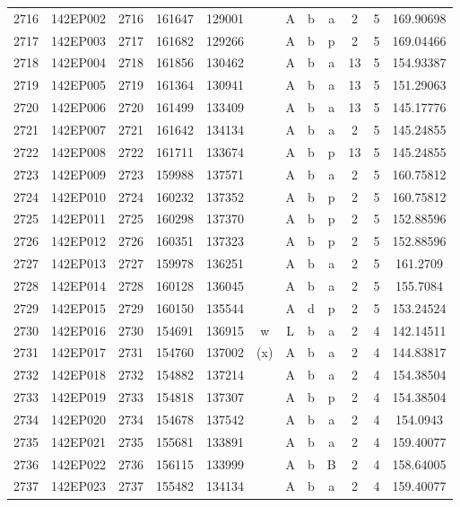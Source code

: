 \begin{tabular}{|*{12}{c|}}
2716 & 142EP002 & 2716 & 161647 & 129001 &  & A & b & a & 2 & 5 & 169.90698 \\ 
2717 & 142EP003 & 2717 & 161682 & 129266 &  & A & b & p & 2 & 5 & 169.04466 \\ 
2718 & 142EP004 & 2718 & 161856 & 130462 &  & A & b & a & 13 & 5 & 154.93387 \\ 
2719 & 142EP005 & 2719 & 161364 & 130941 &  & A & b & a & 13 & 5 & 151.29063 \\ 
2720 & 142EP006 & 2720 & 161499 & 133409 &  & A & b & a & 13 & 5 & 145.17776 \\ 
2721 & 142EP007 & 2721 & 161642 & 134134 &  & A & b & a & 2 & 5 & 145.24855 \\ 
2722 & 142EP008 & 2722 & 161711 & 133674 &  & A & b & p & 13 & 5 & 145.24855 \\ 
2723 & 142EP009 & 2723 & 159988 & 137571 &  & A & b & a & 2 & 5 & 160.75812 \\ 
2724 & 142EP010 & 2724 & 160232 & 137352 &  & A & b & p & 2 & 5 & 160.75812 \\ 
2725 & 142EP011 & 2725 & 160298 & 137370 &  & A & b & p & 2 & 5 & 152.88596 \\ 
2726 & 142EP012 & 2726 & 160351 & 137323 &  & A & b & p & 2 & 5 & 152.88596 \\ 
2727 & 142EP013 & 2727 & 159978 & 136251 &  & A & b & a & 2 & 5 & 161.2709 \\ 
2728 & 142EP014 & 2728 & 160128 & 136045 &  & A & b & a & 2 & 5 & 155.7084 \\ 
2729 & 142EP015 & 2729 & 160150 & 135544 &  & A & d & p & 2 & 5 & 153.24524 \\ 
2730 & 142EP016 & 2730 & 154691 & 136915 & w & L & b & a & 2 & 4 & 142.14511 \\ 
2731 & 142EP017 & 2731 & 154760 & 137002 & (x) & A & b & a & 2 & 4 & 144.83817 \\ 
2732 & 142EP018 & 2732 & 154882 & 137214 &  & A & b & a & 2 & 4 & 154.38504 \\ 
2733 & 142EP019 & 2733 & 154818 & 137307 &  & A & b & p & 2 & 4 & 154.38504 \\ 
2734 & 142EP020 & 2734 & 154678 & 137542 &  & A & b & a & 2 & 4 & 154.0943 \\ 
2735 & 142EP021 & 2735 & 155681 & 133891 &  & A & b & a & 2 & 4 & 159.40077 \\ 
2736 & 142EP022 & 2736 & 156115 & 133999 &  & A & b & B & 2 & 4 & 158.64005 \\ 
2737 & 142EP023 & 2737 & 155482 & 134134 &  & A & b & a & 2 & 4 & 159.40077 \\ 

\end{tabular}
